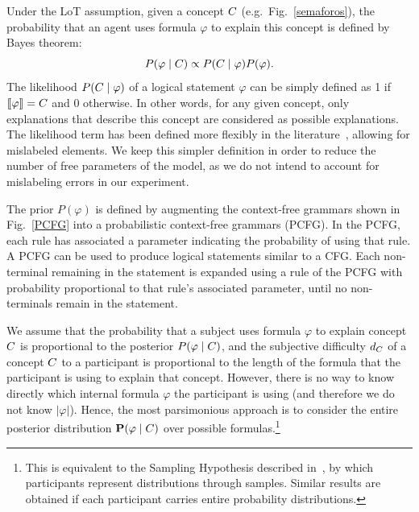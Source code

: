 \newcommand{\form}{\varphi}
Under the LoT assumption,  given a concept $C$ (e.g.\ Fig.~\ref{semaforos}), the probability that an agent uses formula $\form$ to explain this concept is defined by Bayes theorem: 
$$
P(\form\mid \con) \propto P(\con\mid \form)P(\form).
\label{Bayes fix}
$$
%
The likelihood $P(\con\mid \form)$ of a logical statement $\form$ can be simply defined as 1 if $\sem{\form}=\con$ and 0 otherwise. In other words, for any given concept, only explanations that describe this concept are considered as possible explanations. The likelihood term has been defined more flexibly in the literature~\cite{goodman2008rational,piantadosi2016logical}, allowing for mislabeled elements. We keep this simpler definition in order to reduce the number of free parameters of the model, as we do not intend to account for mislabeling errors in our experiment.

The prior $P(\form)$ is defined by augmenting the context-free grammars shown in Fig.~\ref{PCFG} into a probabilistic context-free grammars (PCFG). In the PCFG, each rule has associated a parameter indicating the probability of using that rule. A PCFG can be used to produce logical statements similar to a CFG. Each non-terminal remaining in the statement is expanded using a rule of the PCFG with probability proportional to that rule's associated parameter, until no non-terminals remain in the statement. 

We assume that the probability that a subject uses formula $\form$ to explain concept $C$ is proportional to the posterior $P(\form \mid \con)$, and the subjective difficulty $d_C$ of a concept $C$ to a participant is proportional to the length of the formula that the participant is using to explain that concept. However, there is no way to know directly which internal formula $\form$ the participant is using (and therefore we do not know $|\form|$). Hence, the most parsimonious approach is to consider the entire posterior distribution $\textbf{P}(\form \mid \con)$ over possible formulas.\footnote{This is equivalent to the Sampling Hypothesis described in~\cite{denison2013rational}, by which participants represent distributions through samples. Similar results are obtained if each participant carries entire probability distributions.}

